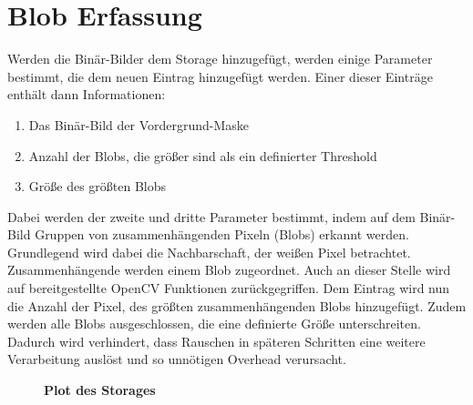 \section{Blob Erfassung}
\label{sec:blob}
%

Werden die Binär-Bilder dem Storage hinzugefügt, werden einige Parameter bestimmt, die dem neuen Eintrag hinzugefügt werden.
Einer dieser Einträge enthält dann Informationen:
\begin{enumerate}
	\item Das Binär-Bild der Vordergrund-Maske
	\item Anzahl der Blobs, die größer sind als ein definierter Threshold
	\item Größe des größten Blobs
\end{enumerate}
Dabei werden der zweite und dritte Parameter bestimmt, indem auf dem Binär-Bild Gruppen von zusammenhängenden Pixeln (Blobs) erkannt werden. 
Grundlegend wird dabei die Nachbarschaft, der weißen Pixel betrachtet. Zusammenhängende werden einem Blob zugeordnet. Auch an dieser Stelle wird auf bereitgestellte OpenCV Funktionen zurückgegriffen. Dem Eintrag wird nun die Anzahl der Pixel, des größten zusammenhängenden Blobs hinzugefügt. Zudem werden alle Blobs ausgeschlossen, die eine definierte Größe unterschreiten. Dadurch wird verhindert, dass Rauschen in späteren Schritten eine weitere Verarbeitung auslöst und so unnötigen Overhead verursacht.
\begin{figure}[ht]
\centering
{}\qquad
\caption{\textbf{Plot des Storages}}
\label{Fig:blobplot}
\end{figure}

